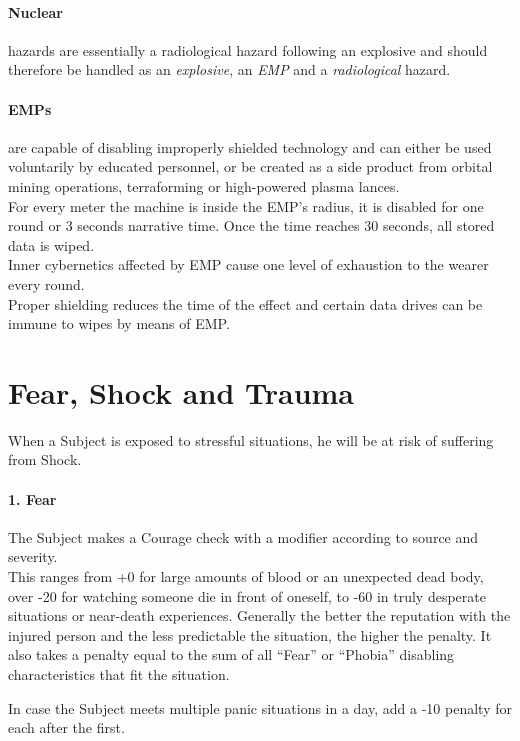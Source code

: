 \documentclass[11pt,a4paper,openany,dvipsnames]{book}
\begin{document}
	\paragraph{Nuclear} hazards are essentially a radiological hazard following an explosive and should therefore be handled as an \emph{explosive}, an \emph{EMP} and a \emph{radiological} hazard.
	\paragraph{EMPs} are capable of disabling improperly shielded technology and can either be used voluntarily by educated personnel, or be created as a side product from orbital mining operations, terraforming or high-powered plasma lances.\\
	For every meter the machine is inside the EMP’s radius, it is disabled for one round or 3 seconds narrative time. Once the time reaches 30 seconds, all stored data is wiped.\\
	Inner cybernetics affected by EMP cause one level of exhaustion to the wearer every round.\\
	Proper shielding reduces the time of the effect and certain data drives can be immune to wipes by means of EMP.
%
	\section{Fear, Shock and Trauma}
	\label{sec:fear}
	When a Subject is exposed to stressful situations,
		he will be at risk of suffering from Shock.
	\\%
	\paragraph{1. Fear}
	The Subject makes a Courage check with a modifier according to source and severity.
	\\%
	This ranges from +0 for large amounts of blood or an unexpected dead body, over -20 for watching someone die in front of oneself, to -60 in truly desperate situations or near-death experiences.
	Generally the better the reputation with the injured person and the less predictable the situation, the higher the penalty. It also takes a penalty equal to the sum of all “Fear” or “Phobia” disabling characteristics that fit the situation.
	\par \vspace{-5mm}
	In case the Subject meets multiple panic situations in a day,
		add a -10 penalty for each after the first.
\end{document}
